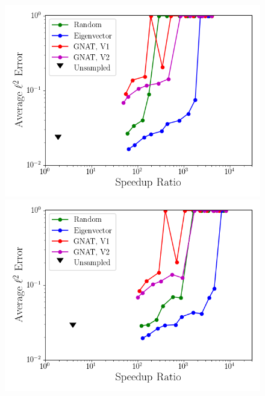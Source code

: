 \begin{figure}
	\begin{minipage}{0.49\linewidth}
		\includegraphics[width=0.99\linewidth]{Chapters/HPROMResults/Images/cvrc/deim/sampled_dt2p5e-7_Average_errorRaw_pareto.png}
		\subcaption{$\dt = 2.5 \times \dtFOM$}
	\end{minipage}
	\begin{minipage}{0.49\linewidth}
		\includegraphics[width=0.99\linewidth]{Chapters/HPROMResults/Images/cvrc/deim/sampled_dt5e-7_Average_errorRaw_pareto.png}
		\subcaption{$\dt = 5 \times \dtFOM$}
	\end{minipage}


\end{figure}
